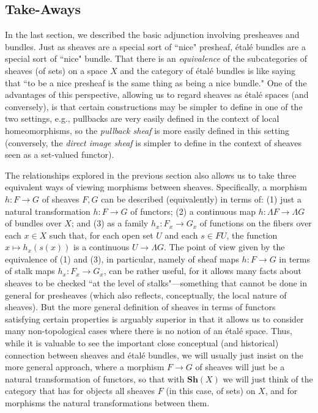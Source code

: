 \documentclass[11pt]{book}
\theoremstyle{definition}
\theoremstyle{definition}
\theoremstyle{definition}
\theoremstyle{theorem}
\theoremstyle{definition}
\begin{document}
\subsection{Take-Aways}
In the last section, we described the basic adjunction involving presheaves and bundles. Just as sheaves are a special sort of ``nice" presheaf, \'etal\'e bundles are a special sort of ``nice" bundle. That there is an \textit{equivalence} of the subcategories of sheaves (of sets) on a space $X$ and the category of \'etal\'e bundles is like saying that ``to be a nice presheaf is the same thing as being a nice bundle." One of the advantages of this perspective, allowing us to regard sheaves as \'etal\'e spaces (and conversely), is that certain constructions may be simpler to define in one of the two settings, e.g., pullbacks are very easily defined in the context of local homeomorphisms, so the \textit{pullback sheaf} is more easily defined in this setting (conversely, the \textit{direct image sheaf} is simpler to define in the context of sheaves seen as a set-valued functor). \par 
The relationships explored in the previous section also allows us to take three equivalent ways of viewing morphisms between sheaves. Specifically, a morphism $h: F \rightarrow G$ of sheaves $F, G$ can be described (equivalently) in terms of: (1) just a natural transformation $h: F \rightarrow G$ of functors; (2) a continuous map $h: \Lambda F \rightarrow \Lambda G$ of bundles over $X$; and (3) as a family $h_x: F_x \rightarrow G_x$ of functions on the fibers over each $x \in X$ such that, for each open set $U$ and each $s \in FU$, the function $x \mapsto h_x(s(x))$ is a continuous $U \rightarrow \Lambda G$. The point of view given by the equivalence of (1) and (3), in particular, namely of sheaf maps $h: F \rightarrow G$ in terms of stalk maps $h_x: F_x \rightarrow G_x$, can be rather useful, for it allows many facts about sheaves to be checked ``at the level of stalks"---something that cannot be done in general for presheaves (which also reflects, conceptually, the local nature of sheaves). But the more general definition of sheaves in terms of functors satisfying certain properties is arguably superior in that it allows us to consider many non-topological cases where there is no notion of an \'etal\'e space. Thus, while it is valuable to see the important close conceptual (and historical) connection between sheaves and \'etal\'e bundles, we will usually just insist on the more general approach, where a morphism $F \rightarrow G$ of sheaves will just be a natural transformation of functors, so that with $\textbf{Sh}(X)$ we will just think of the category that has for objects all sheaves $F$ (in this case, of sets) on $X$, and for morphisms the natural transformations between them. \par
\end{document}
